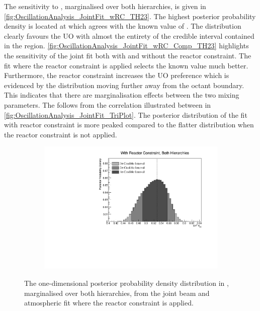 The sensitivity to , marginalised over both hierarchies, is given in \autoref{fig:OscillationAnalysis_JointFit_wRC_TH23}. The highest posterior probability density is located at  which agrees with the known value of . The distribution clearly favours the UO with almost the entirety of the \quickmath{1\sigma} credible interval contained in the region. \autoref{fig:OscillationAnalysis_JointFit_wRC_Comp_TH23} highlights the sensitivity of the joint fit both with and without the reactor constraint. The fit where the reactor constraint is applied selects the known value much better. Furthermore, the reactor constraint increases the UO preference which is evidenced by the distribution moving further away from the octant boundary. This indicates that there are marginalisation effects between the two mixing parameters. The follows from the correlation illustrated between  in \autoref{fig:OscillationAnalysis_JointFit_TriPlot}. The posterior distribution of the fit with reactor constraint is more peaked compared to the flatter distribution when the reactor constraint is not applied. 

\begin{figure}[h]
  \begin{subfigure}[t]{0.98\textwidth}
    \includegraphics[width=\textwidth, trim={0mm 0mm 0mm 0mm}, clip,page=1]{Figures/OA/JointFit_wRC/Contours_1D_th23_BH_1_wRC_UnSmeared_CredibleInterval.pdf}
  \end{subfigure}
  \caption{The one-dimensional posterior probability density distribution in , marginalised over both hierarchies, from the joint beam and atmospheric fit where the reactor constraint is applied.}
  \label{fig:OscillationAnalysis_JointFit_wRC_TH23}
\end{figure}

